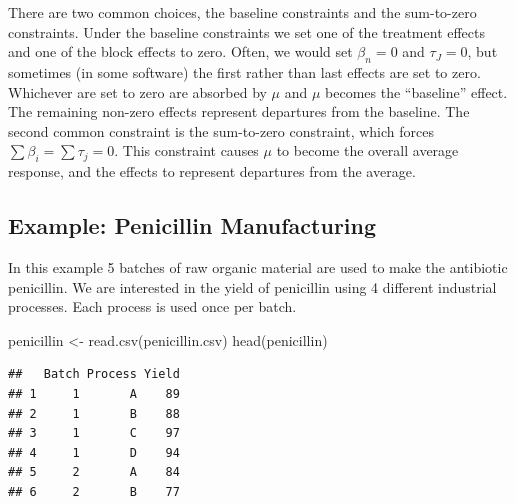 \documentclass[
]{book}
\newenvironment{Shaded}{\begin{snugshade}}{\end{snugshade}}
\newcommand{\AttributeTok}[1]{\textcolor[rgb]{0.77,0.63,0.00}{#1}}
\newcommand{\FunctionTok}[1]{\textcolor[rgb]{0.00,0.00,0.00}{#1}}
\newcommand{\NormalTok}[1]{#1}
\newcommand{\OtherTok}[1]{\textcolor[rgb]{0.56,0.35,0.01}{#1}}
\newcommand{\SpecialCharTok}[1]{\textcolor[rgb]{0.00,0.00,0.00}{#1}}
\newcommand{\StringTok}[1]{\textcolor[rgb]{0.31,0.60,0.02}{#1}}
\begin{document}
There are two common choices, the baseline constraints and the sum-to-zero constraints. Under the baseline constraints we set one of the treatment effects and one of the block effects to zero. Often, we would set \(\beta_n = 0\) and \(\tau_J = 0\), but sometimes (in some software) the first rather than last effects are set to zero. Whichever are set to zero are absorbed by \(\mu\) and \(\mu\) becomes the ``baseline'' effect. The remaining non-zero effects represent departures from the baseline. The second common constraint is the sum-to-zero constraint, which forces \(\sum \beta_i = \sum \tau_j = 0\). This constraint causes \(\mu\) to become the overall average response, and the effects to represent departures from the average.

\hypertarget{example-penicillin-manufacturing}{%
\subsection{Example: Penicillin Manufacturing}\label{example-penicillin-manufacturing}}

In this example 5 batches of raw organic material are used to make the antibiotic penicillin. We are interested in the yield of penicillin using 4 different industrial processes. Each process is used once per batch.

\begin{Shaded}
\begin{Highlighting}[]
\NormalTok{penicillin }\OtherTok{\textless{}{-}} \FunctionTok{read.csv}\NormalTok{(}\StringTok{\textquotesingle{}penicillin.csv\textquotesingle{}}\NormalTok{)}
\FunctionTok{head}\NormalTok{(penicillin)}
\end{Highlighting}
\end{Shaded}

\begin{verbatim}
##   Batch Process Yield
## 1     1       A    89
## 2     1       B    88
## 3     1       C    97
## 4     1       D    94
## 5     2       A    84
## 6     2       B    77
\end{verbatim}

\begin{Shaded}
\end{Shaded}
\end{document}

